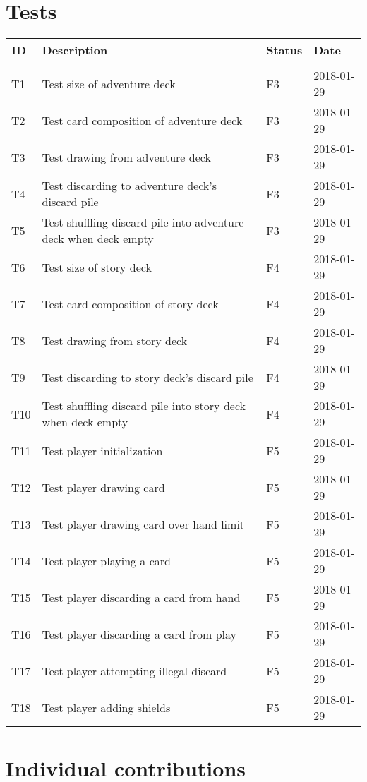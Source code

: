 \documentclass[10pt,a4paper]{article}
\begin{document}
\section*{Tests}

\begin{center}
\begin{tabular}{l l l l }
ID & Description & Status & Date\\
\hline\\
T1 & Test size of adventure deck & F3 & 2018-01-29\\
T2 & Test card composition of adventure deck & F3 & 2018-01-29\\
T3 & Test drawing from adventure deck & F3 & 2018-01-29\\
T4 & Test discarding to adventure deck's discard pile & F3 & 2018-01-29\\
T5 & Test shuffling discard pile into adventure deck when deck empty & F3 & 2018-01-29\\
T6 & Test size of story deck & F4 & 2018-01-29\\
T7 & Test card composition of story deck & F4 & 2018-01-29\\
T8 & Test drawing from story deck & F4 & 2018-01-29\\
T9 & Test discarding to story deck's discard pile & F4 & 2018-01-29\\
T10 & Test shuffling discard pile into story deck when deck empty & F4 & 2018-01-29\\
T11 & Test player initialization & F5 & 2018-01-29\\
T12 & Test player drawing card & F5 & 2018-01-29\\
T13 & Test player drawing card over hand limit & F5 & 2018-01-29\\
T14 & Test player playing a card & F5 & 2018-01-29\\
T15 & Test player discarding a card from hand & F5 & 2018-01-29\\
T16 & Test player discarding a card from play & F5 & 2018-01-29\\
T17 & Test player attempting illegal discard & F5 & 2018-01-29\\
T18 & Test player adding shields & F5 & 2018-01-29\\
\end{tabular}
\end{center}

\section*{Individual contributions}
\end{document}
